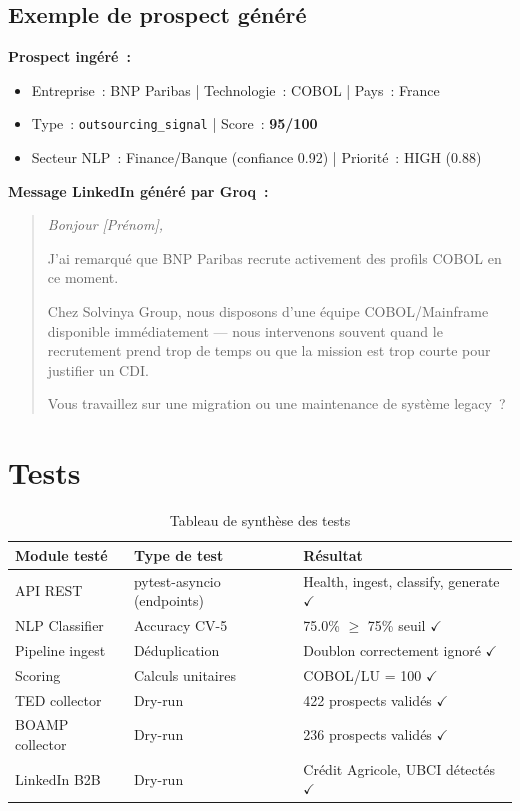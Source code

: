 \subsection{Exemple de prospect généré}

\begin{successbox}
\textbf{Prospect ingéré~:}
\begin{itemize}[nosep]
  \item Entreprise~: BNP Paribas | Technologie~: COBOL | Pays~: France
  \item Type~: \texttt{outsourcing\_signal} | Score~: \textbf{95/100}
  \item Secteur NLP~: Finance/Banque (confiance 0.92) | Priorité~: HIGH (0.88)
\end{itemize}
\vspace{0.3cm}
\textbf{Message LinkedIn généré par Groq~:}
\begin{quote}
\itshape
Bonjour [Prénom],

J'ai remarqué que BNP Paribas recrute activement des profils COBOL en ce moment.

Chez Solvinya Group, nous disposons d'une équipe COBOL/Mainframe disponible
immédiatement — nous intervenons souvent quand le recrutement prend trop de
temps ou que la mission est trop courte pour justifier un CDI.

Vous travaillez sur une migration ou une maintenance de système legacy~?
\end{quote}
\end{successbox}

\section{Tests}

\begin{table}[H]
  \centering
  \begin{tabular}{L{3.5cm} L{4cm} L{5cm}}
    \toprule
    \textbf{Module testé} & \textbf{Type de test} & \textbf{Résultat} \\
    \midrule
    API REST & pytest-asyncio (endpoints) & Health, ingest, classify, generate $\checkmark$ \\
    NLP Classifier & Accuracy CV-5 & 75.0\% $\geq$ 75\% seuil $\checkmark$ \\
    Pipeline ingest & Déduplication & Doublon correctement ignoré $\checkmark$ \\
    Scoring & Calculs unitaires & COBOL/LU = 100 $\checkmark$ \\
    TED collector & Dry-run & 422 prospects validés $\checkmark$ \\
    BOAMP collector & Dry-run & 236 prospects validés $\checkmark$ \\
    LinkedIn B2B & Dry-run & Crédit Agricole, UBCI détectés $\checkmark$ \\
    \bottomrule
  \end{tabular}
  \caption{Tableau de synthèse des tests}
  \label{tab:tests}
\end{table}

